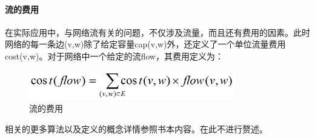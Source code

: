 \documentclass[UTF8]{ctexart}
\begin{document}
    \paragraph{流的费用}
    在实际应用中，与网络流有关的问题，不仅涉及流量，而且还有费用的因素。此时网络的每一条边(v,w)除了给定容量cap(v,w)外，还定义了一个单位流量费用cost(v,w)。对于网络中一个给定的流flow，其费用定义为：

    \begin{figure}[!htb]
      \centering
      \includegraphics[width=0.8\textwidth]{../img/8.2.png}
      \caption{流的费用}\label{流的费用}
    \end{figure}

    相关的更多算法以及定义的概念详情参照书本内容。在此不进行赘述。
\end{document}
